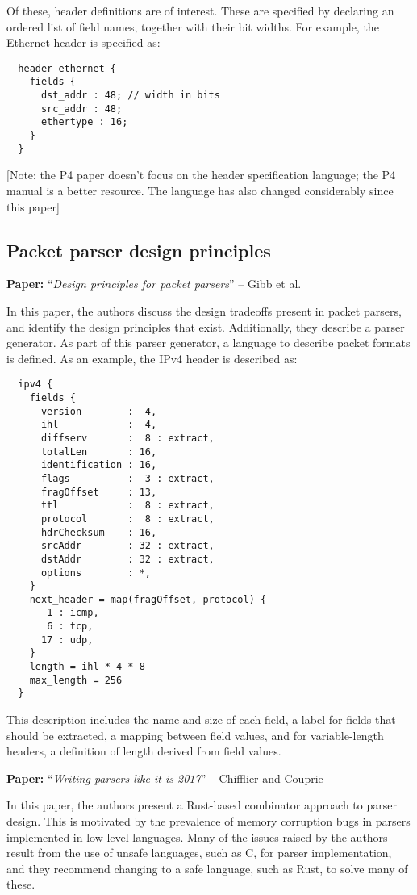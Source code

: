 \documentclass[10pt]{article}
\newcommand{\paper}[3]{\vspace{4mm}\noindent\textbf{Paper:} ``\textit{#1}'' -- #2 \cite{#3}\vspace{3mm}}
\begin{document}
Of these, header definitions are of interest. These are specified by declaring an ordered
list of field names, together with their bit widths. For example, the Ethernet header is
specified as:

\begin{verbatim}
  header ethernet {
    fields {
      dst_addr : 48; // width in bits
      src_addr : 48;
      ethertype : 16;
    }
  }
\end{verbatim}

[Note: the P4 paper doesn't focus on the header specification language; the P4 manual is
a better resource. The language has also changed considerably since this paper]

\subsection{Packet parser design principles}
\paper{Design principles for packet parsers}{Gibb et al.}{gibb2013design}

In this paper, the authors discuss the design tradeoffs present in packet parsers, and
identify the design principles that exist. Additionally, they describe a parser generator.
As part of this parser generator, a language to describe packet formats is defined.
As an example, the IPv4 header is described as:

\begin{verbatim}
  ipv4 {
    fields {
      version        :  4,
      ihl            :  4,
      diffserv       :  8 : extract,
      totalLen       : 16,
      identification : 16,
      flags          :  3 : extract,
      fragOffset     : 13,
      ttl            :  8 : extract,
      protocol       :  8 : extract,
      hdrChecksum    : 16,
      srcAddr        : 32 : extract,
      dstAddr        : 32 : extract,
      options        : *,
    }
    next_header = map(fragOffset, protocol) {
       1 : icmp,
       6 : tcp,
      17 : udp,
    }
    length = ihl * 4 * 8
    max_length = 256
  }
\end{verbatim}

This description includes the name and size of each field, a label for fields that should
be extracted, a mapping between field values, and for variable-length headers, a
definition of length derived from field values.

\paper{Writing parsers like it is 2017}{Chifflier and Couprie}{chifflier2017writing}

In this paper, the authors present a Rust-based combinator approach to parser design. This
is motivated by the prevalence of memory corruption bugs in parsers implemented in
low-level languages. Many of the issues raised by the authors result from the use of
unsafe languages, such as C, for parser implementation, and they recommend changing to a 
safe language, such as Rust, to solve many of these.
\end{document}
